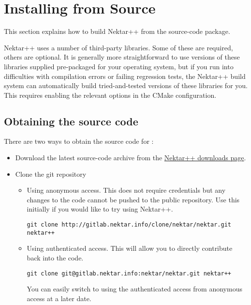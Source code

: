\section{Installing from Source}
\label{s:installation:source}

This section explains how to build Nektar++ from the source-code package.

Nektar++ uses a number of third-party libraries. Some of these are required,
others are optional. It is generally more straightforward to use versions of
these libraries supplied pre-packaged for your operating system, but if you run
into difficulties with compilation errors or failing regression tests, the
Nektar++ build system can automatically build tried-and-tested versions of these
libraries for you. This requires enabling the relevant options in the CMake
configuration.


\subsection{Obtaining the source code}
There are two ways to obtain the source code for \nekpp:
\begin{itemize}
	\item Download the latest source-code archive from the
	\href{http://www.nektar.info/downloads}{Nektar++ downloads page}.
	\item Clone the git repository
	\begin{itemize}
	\item Using anonymous access. This does not require
	credentials but any changes to the code cannot be pushed to the
	public repository. Use this initially if you would like to try using 
	Nektar++.
    \begin{lstlisting}[style=BashInputStyle]
        git clone http://gitlab.nektar.info/clone/nektar/nektar.git nektar++
    \end{lstlisting}
	\item Using authenticated access. This will allow you to directly contribute
	back into the code.
    \begin{lstlisting}[style=BashInputStyle]
        git clone git@gitlab.nektar.info:nektar/nektar.git nektar++
    \end{lstlisting}
    \begin{tipbox}
    You can easily switch to using the authenticated access from anonymous
    access at a later date.
    \end{tipbox}
	\end{itemize}
\end{itemize}

